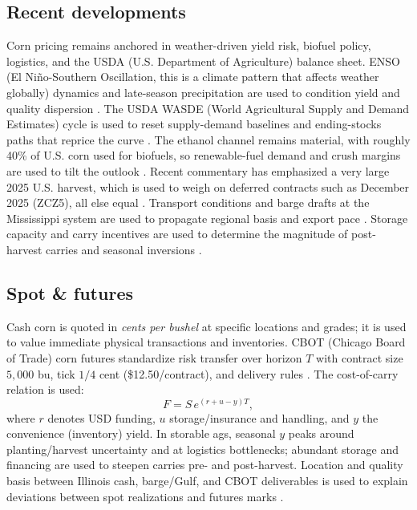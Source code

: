 \documentclass[11pt,a4paper]{article} %
\begin{document}
\subsection{Recent developments}
Corn pricing remains anchored in weather-driven yield risk, biofuel policy, logistics, and the USDA (U.S. Department of Agriculture) balance sheet. ENSO (El Niño-Southern Oscillation, this is a climate pattern that affects weather globally) dynamics and late-season precipitation are used to condition yield and quality dispersion \citep{noaa_enso_discussion}. The USDA WASDE (World Agricultural Supply and Demand Estimates) cycle is used to reset supply-demand baselines and ending-stocks paths that reprice the curve \citep{usda_wasde,usda_understanding_wasde}. The ethanol channel remains material, with roughly 40\% of U.S. corn used for biofuels, so renewable-fuel demand and crush margins are used to tilt the outlook \citep{ers_ethanol_40,ers_ethanol_2030}. Recent commentary has emphasized a very large 2025 U.S. harvest, which is used to weigh on deferred contracts such as December 2025 (ZCZ5), all else equal \citep{reuters_record_crop_2025,ers_feedgrains_outlook}. Transport conditions and barge drafts at the Mississippi system are used to propagate regional basis and export pace \citep{ams_gtr_2023}. Storage capacity and carry incentives are used to determine the magnitude of post-harvest carries and seasonal inversions \citep{ncga_storage_2025}.

\subsection{Spot \& futures}
Cash corn is quoted in \emph{cents per bushel} at specific locations and grades; it is used to value immediate physical transactions and inventories. CBOT (Chicago Board of Trade) corn futures standardize risk transfer over horizon \(T\) with contract size \(5{,}000\) bu, tick \(1/4\) cent (\$12.50/contract), and delivery rules \citep{barchart_zc_specs}. The cost-of-carry relation is used:
\[
F=S\,e^{(r+u-y)T},
\]
where \(r\) denotes USD funding, \(u\) storage/insurance and handling, and \(y\) the convenience (inventory) yield. In storable ags, seasonal \(y\) peaks around planting/harvest uncertainty and at logistics bottlenecks; abundant storage and financing are used to steepen carries pre- and post-harvest. Location and quality basis between Illinois cash, barge/Gulf, and CBOT deliverables is used to explain deviations between spot realizations and futures marks \citep{ams_gtr_2023}.
\end{document}
